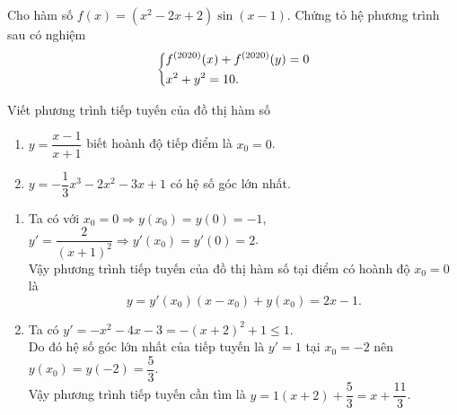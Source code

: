 \begin{bt}%
    Cho hàm số $f(x)=\left(x^2-2x+2\right)\sin(x-1)$. Chứng tỏ hệ phương trình sau có nghiệm
    \[\left\{\begin{aligned}&f^{(2020)}(x)+f^{(2020)}(y)=0\\&x^2+y^2=10.\end{aligned}\right.\]
\end{bt}

\begin{bt}%
    Viết phương trình tiếp tuyến của đồ thị hàm số
    \begin{enumerate}
        \item $y=\dfrac{x-1}{x+1}$ biết hoành độ tiếp điểm là $x_0=0$.
        \item $y=-\dfrac{1}{3}x^3-2x^2-3x+1$ có hệ số góc lớn nhất.
    \end{enumerate}
    \loigiai
    {\begin{enumerate}
            \item Ta có với $x_0=0 \Rightarrow y(x_0)=y(0)=-1$, $y'=\dfrac{2}{(x+1)^2}\Rightarrow y'\left(x_0\right)=y'(0)=2$.\\
            Vậy phương trình tiếp tuyến của đồ thị hàm số tại điểm có hoành độ $x_0=0$ là
            \[y=y'(x_0)(x-x_0)+y(x_0) = 2x-1.\]
            \item Ta có $y'=-x^2-4x-3 = -(x+2)^2+1 \leq 1$. \\
            Do đó hệ số góc lớn nhất của tiếp tuyến là $y'=1$ tại $x_0=-2$ nên $y(x_0)=y(-2)=\dfrac{5}{3}$.\\
            Vậy phương trình tiếp tuyến cần tìm là $y=1(x+2)+\dfrac{5}{3}= x+\dfrac{11}{3}$.
    \end{enumerate}}
\end{bt}

